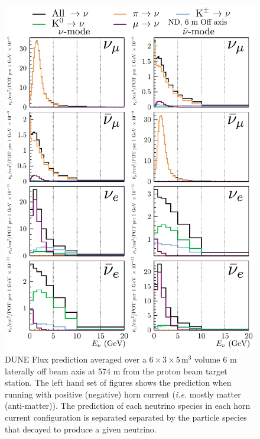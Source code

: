 \documentclass{article}
\begin{document}
\begin{figure}
  \includegraphics[width=\textwidth]{plots/fluxpredcompvar/ND_HadronParentFluxComponents_6m_offaxis}
  \caption{DUNE Flux prediction averaged over a $6\times 3\times 5\,\textrm{m}^{3}$ volume 6 m laterally off beam axis at 574 m from the proton beam target station. The left hand set of figures shows the prediction when running with positive (negative) horn current (\textit{i.e.} mostly matter (anti-matter)). The prediction of each neutrino species in each horn current configuration is separated separated by the particle species that decayed to produce a given neutrino.}
\end{figure}
\end{document}

